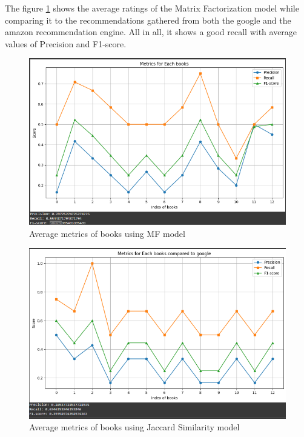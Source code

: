     \newpage

    The figure \ref{Metrics-mf} shows the average ratings of the Matrix Factorization model while comparing it to the recommendations gathered from both the google and the amazon recommendation engine. All in all, it shows a good recall with average values of Precision and F1-score.

    \begin{figure}[h]
        \centering
        \includegraphics[width=1\linewidth]{img/Graphics/MF_model.PNG}
        \caption{Average metrics of books using MF model}
        \label{Metrics-mf}
    \end{figure}
    
    \newpage

    \begin{figure}[h]
        \centering
        \includegraphics[width=1\linewidth]{img/Graphics/JS_Google.PNG}
        \caption{Average metrics of books using Jaccard Similarity model}
        \label{Metrics-js-google}
    \end{figure}

